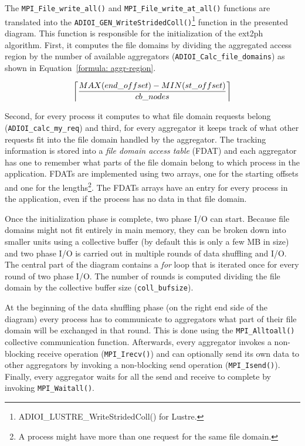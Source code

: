 The \texttt{MPI\_File\_write\_all()} and \texttt{MPI\_File\_write\_at\_all()} functions are translated into the \texttt{ADIOI\_GEN\_WriteStridedColl()}\footnote{ADIOI\_LUSTRE\_WriteStridedColl() for Lustre.} 
function in the presented diagram. This function is responsible for the initialization of the ext2ph algorithm. First, it computes the file domains by dividing the aggregated access region by the number of 
available aggregators (\texttt{ADIOI\_Calc\_file\_domains}) as shown in Equation~\ref{formula: aggr-region}.

\begin{equation}\label{formula: aggr-region}
    \ceil*{\frac{MAX(end\_offset) - MIN(st\_offset)}{cb\_nodes}}
\end{equation}

Second, for every process it computes to what file domain requests belong (\texttt{ADIOI\_calc\_my\_req}) and third, for every aggregator it keeps track of what other requests fit into the file domain handled 
by the aggregator. The tracking information is stored into a \textit{file domain access table} (FDAT) and each aggregator has one to remember what parts of the file domain belong to which process in the 
application. FDATs are implemented using two arrays, one for the starting offsets and one for the lengths\footnote{A process might have more than one request for the same file domain.}. The FDATs arrays
have an entry for every process in the application, even if the process has no data in that file domain.

Once the initialization phase is complete, two phase I/O can start. Because file domains might not fit entirely in main memory, they can be broken down into smaller units using a collective buffer 
(by default this is only a few MB in size) and two phase I/O is carried out in multiple rounds of data shuffling and I/O. The central part of the diagram contains a \textit{for} loop that is iterated 
once for every round of two phase I/O. The number of rounds is computed dividing the file domain by the collective buffer size (\texttt{coll\_bufsize}).

At the beginning of the data shuffling phase (on the right end side of the diagram) every process has to communicate to aggregators what part of their file domain will be exchanged in that round. This is 
done using the \texttt{MPI\_Alltoall()} collective communication function. Afterwards, every aggregator invokes a non-blocking receive operation (\texttt{MPI\_Irecv()}) and can optionally send its own data
to other aggregators by invoking a non-blocking send operation (\texttt{MPI\_Isend()}). Finally, every aggregator waits for all the send and receive to complete by invoking \texttt{MPI\_Waitall()}. 

